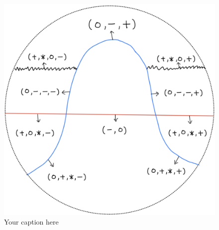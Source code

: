 \begin{figure}[H] 
    \centering
    \includegraphics[scale = 0.95]{diagrams/lemma2/2.png} 
    \caption{Your caption here}
    \label{fig:your-label}
\end{figure}